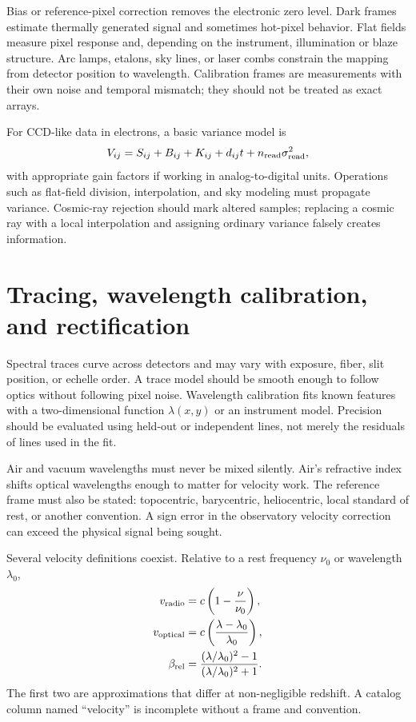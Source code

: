 Bias or reference-pixel correction removes the electronic zero level.  Dark frames
estimate thermally generated signal and sometimes hot-pixel behavior.  Flat fields
measure pixel response and, depending on the instrument, illumination or blaze
structure.  Arc lamps, etalons, sky lines, or laser combs constrain the mapping from
detector position to wavelength.  Calibration frames are measurements with their own
noise and temporal mismatch; they should not be treated as exact arrays.

For CCD-like data in electrons, a basic variance model is
\begin{equation}
 V_{ij}=S_{ij}+B_{ij}+K_{ij}+d_{ij}t
       +n_{\rm read}\sigma_{\rm read}^2,
 \label{eq:variance-model}
\end{equation}
with appropriate gain factors if working in analog-to-digital units.  Operations such
as flat-field division, interpolation, and sky modeling must propagate variance.
Cosmic-ray rejection should mark altered samples; replacing a cosmic ray with a local
interpolation and assigning ordinary variance falsely creates information.

\section{Tracing, wavelength calibration, and rectification}

Spectral traces curve across detectors and may vary with exposure, fiber, slit
position, or echelle order.  A trace model should be smooth enough to follow optics
without following pixel noise.  Wavelength calibration fits known features with a
two-dimensional function $\lambda(x,y)$ or an instrument model.  Precision should be
evaluated using held-out or independent lines, not merely the residuals of lines used
in the fit.

Air and vacuum wavelengths must never be mixed silently.  Air's refractive index
shifts optical wavelengths enough to matter for velocity work.  The reference frame
must also be stated: topocentric, barycentric, heliocentric, local standard of rest,
or another convention.  A sign error in the observatory velocity correction can
exceed the physical signal being sought.

Several velocity definitions coexist.  Relative to a rest frequency $\nu_0$ or
wavelength $\lambda_0$,
\begin{align}
 v_{\rm radio} &= c\left(1-\frac{\nu}{\nu_0}\right),\\
 v_{\rm optical} &= c\left(\frac{\lambda-\lambda_0}{\lambda_0}\right),\\
 \beta_{\rm rel} &=
 \frac{(\lambda/\lambda_0)^2-1}{(\lambda/\lambda_0)^2+1}.
 \label{eq:velocity-conventions}
\end{align}
The first two are approximations that differ at non-negligible redshift.  A catalog
column named ``velocity'' is incomplete without a frame and convention.

